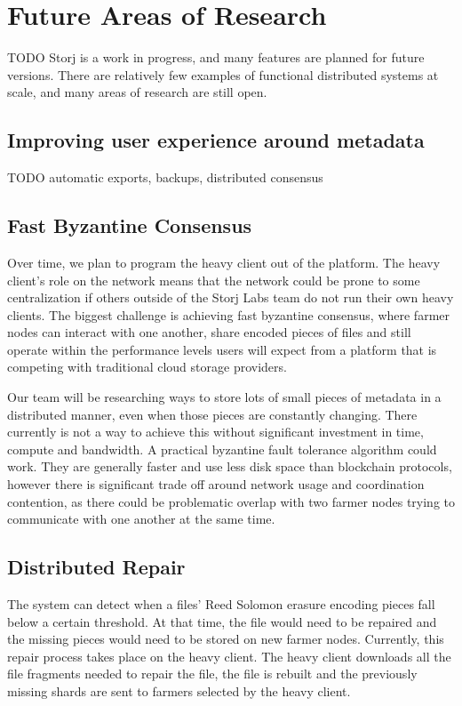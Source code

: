 \documentclass[a4paper,10pt]{article} \usepackage[utf8]{inputenc}
\newcommand{\todo}[1]{{\color{red} TODO #1 }}
\begin{document}
\section{Future Areas of Research}\label{sec:future_work}

\todo{ Storj is a work in progress, and many features are planned for future
versions. There are relatively few examples of functional distributed systems at
scale, and many areas of research are still open. }

\subsection{Improving user experience around metadata}

\todo{automatic exports, backups, distributed consensus}

\subsection{Fast Byzantine Consensus}

Over time, we plan to program the heavy client out of the platform. The heavy
client's role on the network means that the network could be prone to some
centralization if others outside of the Storj Labs team do not run their own
heavy clients. The biggest challenge is achieving fast byzantine consensus,
where farmer nodes can interact with one another, share encoded pieces of files
and still operate within the performance levels users will expect from a
platform that is competing with traditional cloud storage providers.

Our team will be researching ways to store lots of small pieces of metadata
in a distributed manner, even when those pieces are constantly changing. There
currently is not a way to achieve this without significant investment in time,
compute and bandwidth. A practical byzantine fault tolerance algorithm could
work. They are generally faster and use less disk space than blockchain
protocols, however there is significant trade off around network usage and
coordination contention, as there could be problematic overlap with two farmer
nodes trying to communicate with one another at the same time.

\subsection{Distributed Repair}

The system can detect when a files' Reed Solomon erasure encoding pieces fall
below a certain threshold. At that time, the file would need to be repaired and
the missing pieces would need to be stored on new farmer nodes. Currently, this
repair process takes place on the heavy client. The heavy client downloads all
the file fragments needed to repair the file, the file is rebuilt and the
previously missing shards are sent to farmers selected by the heavy client.
\end{document}
